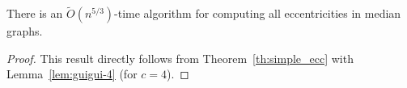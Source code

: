 \documentclass[a4paper,UKenglish,numberwithinsect,cleveref, autoref]{lipics-v2021}
\newcommand{\rc}{\mbox{RC}}
\begin{document}
\begin{theorem}\label{thm:guigui-5}
There is an $\tilde{O}(n^{5/3})$-time algorithm for computing all eccentricities in median graphs.
\end{theorem}
\begin{proof}
This result directly follows from Theorem~\ref{th:simple_ecc} with Lemma~\ref{lem:guigui-4} (for $c = 4$).
\end{proof}


%
%
%
%
%
%
%
%
\end{document}
